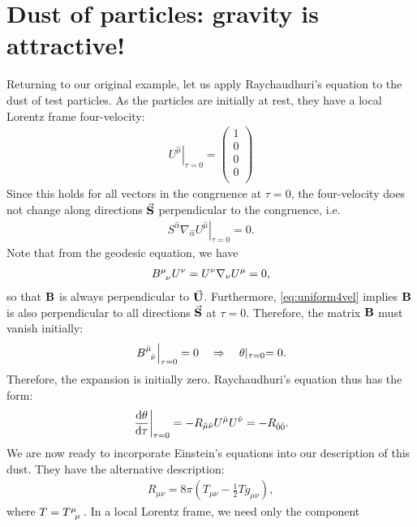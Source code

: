\documentclass[10pt]{article}
\newcommand{\<}{\langle}
\renewcommand{\>}{\rangle}
\renewcommand{\(}{\left(}
\renewcommand{\)}{\right)}
\renewcommand{\[}{\left[}
\renewcommand{\]}{\right]}
\begin{document}
		\section{Dust of particles: gravity is attractive!}
		Returning to our original example, let us apply Raychaudhuri's equation to the dust of test particles. As the particles are initially at rest, they have a local Lorentz frame four-velocity:
		\begin{align}
			\left.U^{\hat{\mu}}\right|_{\tau=0} = 
			\begin{pmatrix}
				1\\
				0\\
				0\\
				0\\
			\end{pmatrix}
		\end{align}
		Since this holds for all vectors in the congruence at $\tau=0$, the four-velocity does not change along directions $\va{S}$ perpendicular to the congruence, i.e.
		\begin{align}\label{eq:uniform4vel}
			\left.S^{\hat{\alpha}} \nabla_{\hat{\alpha}} U^{\hat{\mu}}\right|_{\tau=0} = 0.
		\end{align}
		Note that from the geodesic equation, we have
		\begin{align}
			\tensor{B}{^\mu_\nu} U^\nu = U^\nu \nabla_\nu U^\mu = 0,
		\end{align}
		so that $\vb{B}$ is always perpendicular to $\va{U}$. Furthermore, \eqref{eq:uniform4vel} implies $\vb{B}$ is also perpendicular to all directions $\va{S}$ at $\tau=0$. Therefore, the matrix $\vb{B}$ must vanish initially:
		\begin{align}
			\left.\tensor{B}{^{\hat{\mu}}_{\hat{\nu}}}\right|_{\tau=0} = 0 \quad\Rightarrow\quad \theta\lvert_{\tau=0} = 0.
		\end{align}
		Therefore, the expansion is initially zero. Raychaudhuri's equation thus has the form:
		\begin{align}
			\left.\dv{\theta}{\tau}\right|_{\tau=0} = -R_{\hat{\mu}\hat{\nu}} U^{\hat{\mu}} U^{\hat{\nu}} = -R_{\hat{0}\hat{0}}.
		\end{align}
		We are now ready to incorporate Einstein's equations into our description of this dust. They have the alternative description:
		\begin{align}
			R_{\mu\nu} = 8\pi \( T_{\mu\nu} - \frac{1}{2}T g_{\mu\nu} \),
		\end{align}
		where $T=\tensor{T}{^\mu_\mu}$. In a local Lorentz frame, we need only the component
\end{document}
